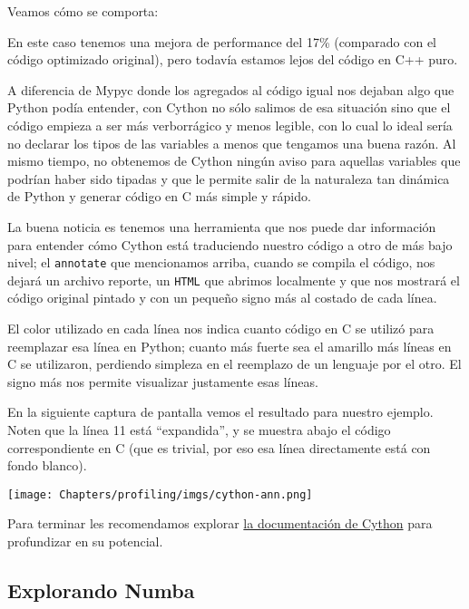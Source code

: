 Veamos cómo se comporta:


En este caso tenemos una mejora de performance del 17\% (comparado con el código optimizado original), pero todavía estamos lejos del código en C++ puro.

A diferencia de Mypyc donde los agregados al código igual nos dejaban algo que Python podía entender, con Cython no sólo salimos de esa situación sino que el código empieza a ser más verborrágico y menos legible, con lo cual lo ideal sería no declarar los tipos de las variables a menos que tengamos una buena razón. Al mismo tiempo, no obtenemos de Cython ningún aviso para aquellas variables que podrían haber sido tipadas y que le permite salir de la naturaleza tan dinámica de Python y generar código en C más simple y rápido.

La buena noticia es tenemos una herramienta que nos puede dar información para entender cómo Cython está traduciendo nuestro código a otro de más bajo nivel; el \texttt{annotate} que mencionamos arriba, cuando se compila el código, nos dejará un archivo reporte, un \texttt{HTML} que abrimos localmente y que nos mostrará el código original pintado y con un pequeño signo más al costado de cada línea.

El color utilizado en cada línea nos indica cuanto código en C se utilizó para reemplazar esa línea en Python; cuanto más fuerte sea el amarillo más líneas en C se utilizaron, perdiendo simpleza en el reemplazo de un lenguaje por el otro. El signo más nos permite visualizar justamente esas líneas.

En la siguiente captura de pantalla vemos el resultado para nuestro ejemplo. Noten que la línea 11 está ``expandida'', y se muestra abajo el código correspondiente en C (que es trivial, por eso esa línea directamente está con fondo blanco).

\texttt{[image: Chapters/profiling/imgs/cython-ann.png]}

Para terminar les recomendamos explorar \href{https://cython.readthedocs.io/en/latest/index.html}{la documentación de Cython} para profundizar en su potencial.


\subsection{Explorando Numba}

